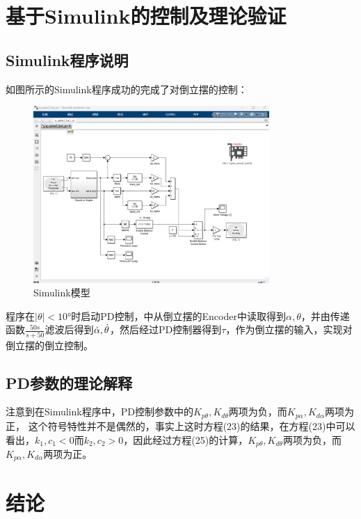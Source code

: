 \documentclass[UTF8]{ctexart}
\begin{document}
\newpage

\section{基于Simulink的控制及理论验证}

\subsection{Simulink程序说明}

如图所示的Simulink程序成功的完成了对倒立摆的控制：

\begin{figure}[htbp]
    \centering
    \includegraphics[width=0.8\textwidth]{Simulink.png}
    \caption{Simulink模型}
\end{figure}

程序在$|\theta|<10°$时启动PD控制，中从倒立摆的Encoder中读取得到$\alpha,\theta$，并由传递函数$\frac{50s}{s+50}$滤波后得到$\dot{\alpha},\dot{\theta}$，然后经过PD控制器得到$\tau$，作为倒立摆的输入，实现对倒立摆的倒立控制。

\subsection{PD参数的理论解释}

注意到在Simulink程序中，PD控制参数中的$K_{p\theta},K_{d\theta}$两项为负，而$K_{p\alpha},K_{d\alpha}$两项为正，
这个符号特性并不是偶然的，事实上这时方程(23)的结果，在方程(23)中可以看出，$k_1,c_1<0$而$k_2,c_2>0$，因此经过方程(25)的计算，$K_{p\theta},K_{d\theta}$两项为负，而$K_{p\alpha},K_{d\alpha}$两项为正。

\section{结论}
\end{document}
